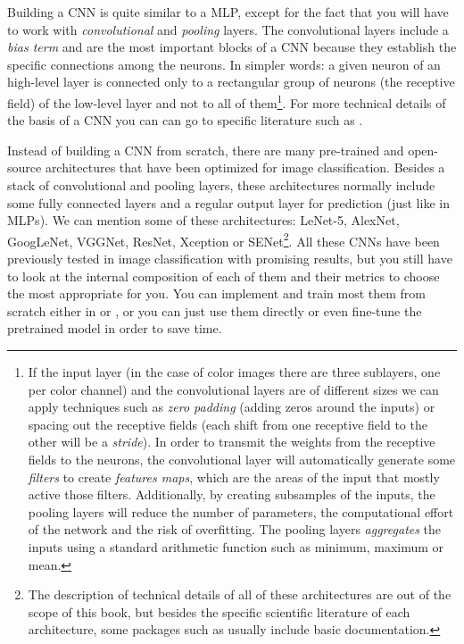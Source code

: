 Building a CNN is quite similar to a MLP, except for the fact that you will have to work with \textit{convolutional} and \textit{pooling} layers. The convolutional layers include a \textit{bias term} and are the most important blocks of a CNN because they establish the specific connections  among the neurons. In simpler words: a given neuron of an high-level layer is connected only to a rectangular group of neurons (the receptive field) of the low-level layer and not to all of them\footnote{If the input layer (in the case of color images there are three sublayers, one per color channel) and the convolutional layers are of different sizes we can apply techniques such as \textit{zero padding} (adding zeros around the inputs) or spacing out the receptive fields (each shift from one receptive field to the other will be a \textit{stride}). In order to transmit the weights from the receptive fields to the neurons, the convolutional layer will automatically generate some \textit{filters} to create \textit{features maps}, which are the areas of the input that mostly active those filters. Additionally, by creating subsamples of the inputs, the pooling layers will reduce the number of parameters, the computational effort of the network and the risk of overfitting. The pooling layers \textit{aggregates} the inputs using a standard arithmetic function such as minimum, maximum or mean.}. For more technical details of the basis of a CNN you can can go to specific literature such as \cite{geron2019hands}.

Instead of building a CNN from scratch, there are many pre-trained and open-source architectures that have been optimized for image classification. Besides a stack of convolutional and pooling layers,  these architectures normally include some fully connected layers and a regular output layer for prediction (just like in MLPs). We can mention some of these architectures: LeNet-5, AlexNet, GoogLeNet, VGGNet, ResNet, Xception or SENet\footnote{The description of technical details of all of these architectures are out of the scope of this book, but besides the specific scientific literature of each architecture, some packages such as  usually include basic documentation.}. All these CNNs have been previously tested in image classification with promising results, but you still have to look at the internal composition of each of them and their metrics to choose the most appropriate for you. You can implement and train most them from scratch either in  or , or you can just use them directly or even fine-tune the pretrained model in order to save time. 

